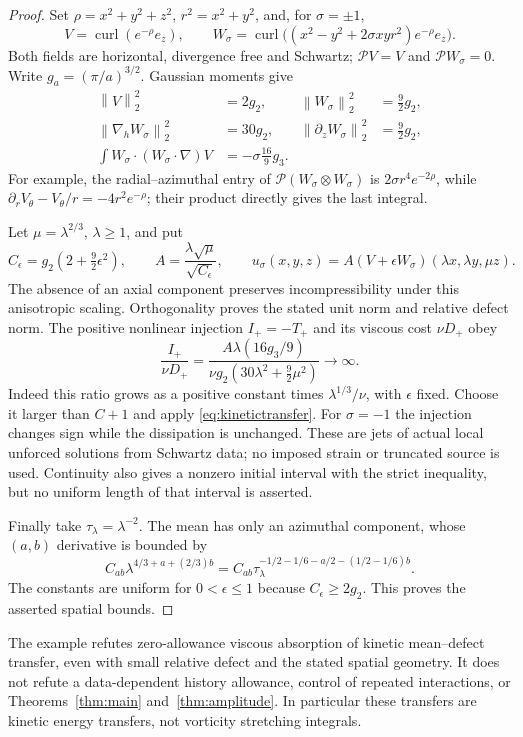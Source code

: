\documentclass[11pt]{article}
\theoremstyle{remark}
\newcommand{\PP}{\mathcal P}
\newcommand{\norm}[1]{\left\lVert#1\right\rVert}
\newcommand{\curl}{\operatorname{curl}}
\begin{document}
\begin{proof}
Set $\rho=x^2+y^2+z^2$, $r^2=x^2+y^2$, and, for $\sigma=\pm1$,
\[
 V=\curl(e^{-\rho}e_z),\qquad
 W_\sigma=\curl\big((x^2-y^2+2\sigma xy r^2)e^{-\rho}e_z\big).
\]
Both fields are horizontal, divergence free and Schwartz;
$\PP V=V$ and $\PP W_\sigma=0$. Write $g_a=(\pi/a)^{3/2}$.
Gaussian moments give
\begin{align*}
 \norm V_2^2&=2g_2,& \norm{W_\sigma}_2^2&=\tfrac92 g_2,\\
 \norm{\nabla_h W_\sigma}_2^2&=30g_2,&
 \norm{\partial_z W_\sigma}_2^2&=\tfrac92 g_2,\\
 \int W_\sigma\cdot(W_\sigma\cdot\nabla)V
       &=-\sigma\tfrac{16}{9}g_3.
\end{align*}
For example, the radial--azimuthal entry of
$\PP(W_\sigma\otimes W_\sigma)$ is
$2\sigma r^4e^{-2\rho}$, while
$\partial_r V_\theta-V_\theta/r=-4r^2e^{-\rho}$;
their product directly gives the last integral.

Let $\mu=\lambda^{2/3}$, $\lambda\geq1$, and put
\[
 C_\epsilon=g_2(2+\tfrac92\epsilon^2),\qquad
 A=\frac{\lambda\sqrt\mu}{\sqrt{C_\epsilon}},\qquad
 u_\sigma(x,y,z)=A(V+\epsilon W_\sigma)(\lambda x,\lambda y,\mu z).
\]
The absence of an axial component preserves incompressibility under
this anisotropic scaling. Orthogonality proves the stated unit norm
and relative defect norm. The positive nonlinear injection $I_+=-T_+$
and its viscous cost $\nu D_+$ obey
\[
 \frac{I_+}{\nu D_+}
 =\frac{A\lambda(16g_3/9)}
        {\nu g_2(30\lambda^2+\tfrac92\mu^2)}
 \longrightarrow\infty.
\]
Indeed this ratio grows as a positive constant times
$\lambda^{1/3}/\nu$, with $\epsilon$ fixed. Choose it larger than
$C+1$ and apply \eqref{eq:kinetictransfer}. For $\sigma=-1$ the
injection changes sign while the dissipation is unchanged. These are
jets of actual local unforced solutions from Schwartz data; no imposed
strain or truncated source is used. Continuity also gives a nonzero
initial interval with the strict inequality, but no uniform length
of that interval is asserted.

Finally take $\tau_\lambda=\lambda^{-2}$. The mean has only an
azimuthal component, whose $(a,b)$ derivative is bounded by
\[
 C_{ab}\lambda^{4/3+a+(2/3)b}
 =C_{ab}\tau_\lambda^{-1/2-1/6-a/2-(1/2-1/6)b}.
\]
The constants are uniform for $0<\epsilon\leq1$ because
$C_\epsilon\geq2g_2$. This proves the asserted spatial bounds.
\end{proof}

The example refutes zero-allowance viscous absorption of kinetic
mean--defect transfer, even with small relative defect and the stated
spatial geometry. It does not refute a data-dependent history allowance,
control of repeated interactions, or Theorems~\ref{thm:main}
and~\ref{thm:amplitude}. In particular these transfers are kinetic
energy transfers, not vorticity stretching integrals.
\end{document}
